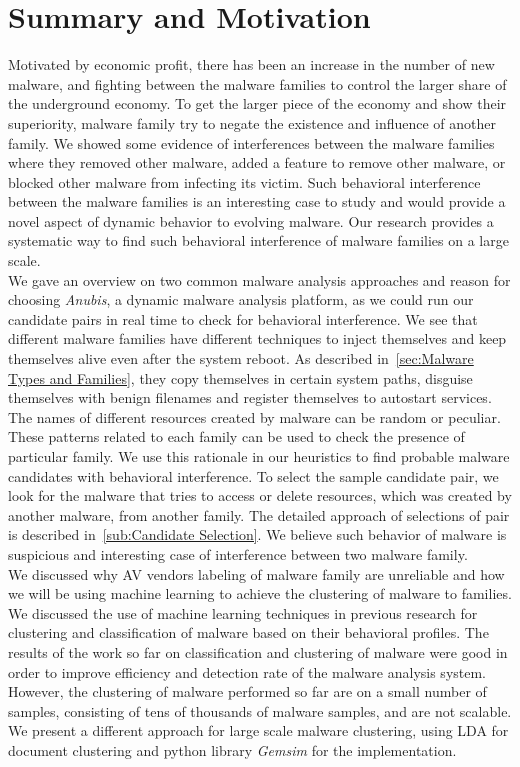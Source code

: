 \section{Summary and Motivation}
\label{sec:Motivation}
Motivated by economic profit, there has been an increase in the number of new malware, and fighting between the malware families to control the larger share of the underground economy.
To get the larger piece of the economy and show their superiority, malware family try to negate the existence and influence of another family.
We showed some evidence of interferences between the malware families where they removed other malware, added a feature to remove other malware, or blocked other malware from infecting its victim.
Such behavioral interference between the malware families is an interesting case to study and would provide a novel aspect of dynamic behavior to evolving malware.
Our research provides a systematic way to find such behavioral interference of malware families on a large scale.
\\

We gave an overview on two common malware analysis approaches and reason for choosing \emph{Anubis}, a dynamic malware analysis platform, as we could run our candidate pairs in real time to check for behavioral interference.
We see that different malware families have different techniques to inject themselves and keep themselves alive even after the system reboot.
As described in~\autoref{sec:Malware Types and Families}, they copy themselves in certain system paths, disguise themselves with benign filenames and register themselves to autostart services.
The names of different resources created by malware can be random or peculiar.
These patterns related to each family can be used to check the presence of particular family.
We use this rationale in our heuristics to find probable malware candidates with behavioral interference.
To select the sample candidate pair, we look for the malware that tries to access or delete resources, which was created by another malware, from another family.
The detailed approach of selections of pair is described in~\autoref{sub:Candidate Selection}.
We believe such behavior of malware is suspicious and interesting case of interference between two malware family.\\

We discussed why AV vendors labeling of malware family are unreliable and how we will be using machine learning to achieve the clustering of malware to families.
We discussed the use of machine learning techniques in previous research for clustering and classification of malware based on their behavioral profiles.
The results of the work so far on classification and clustering of malware were good in order to improve efficiency and detection rate of the malware analysis system.
However, the clustering of malware performed so far are on a small number of samples, consisting of tens of thousands of malware samples, and are not scalable.
We present a different approach for large scale malware clustering, using LDA for document clustering and python library \emph{Gemsim} for the implementation.\\

